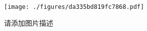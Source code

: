 
\begin{figure}[ht]
\centering
\texttt{[image: ./figures/da335bd819fc7868.pdf]}
\caption{请添加图片描述} \label{fig_svgtst_1}
\end{figure}
